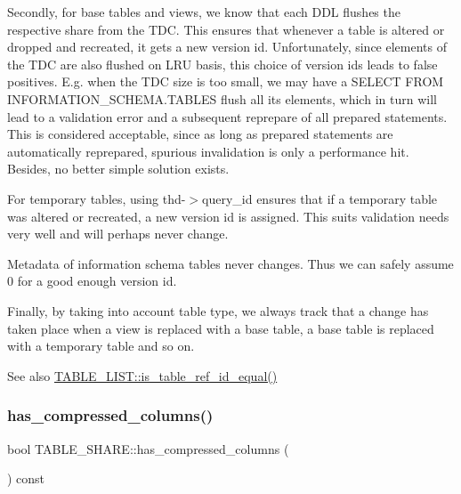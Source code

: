 Secondly, for base tables and views, we know that each D\+DL flushes the respective share from the T\+DC. This ensures that whenever a table is altered or dropped and recreated, it gets a new version id. Unfortunately, since elements of the T\+DC are also flushed on L\+RU basis, this choice of version ids leads to false positives. E.\+g. when the T\+DC size is too small, we may have a S\+E\+L\+E\+CT F\+R\+OM I\+N\+F\+O\+R\+M\+A\+T\+I\+O\+N\+\_\+\+S\+C\+H\+E\+M\+A.\+T\+A\+B\+L\+ES flush all its elements, which in turn will lead to a validation error and a subsequent reprepare of all prepared statements. This is considered acceptable, since as long as prepared statements are automatically reprepared, spurious invalidation is only a performance hit. Besides, no better simple solution exists.

For temporary tables, using thd-\/$>$query\+\_\+id ensures that if a temporary table was altered or recreated, a new version id is assigned. This suits validation needs very well and will perhaps never change.

Metadata of information schema tables never changes. Thus we can safely assume 0 for a good enough version id.

Finally, by taking into account table type, we always track that a change has taken place when a view is replaced with a base table, a base table is replaced with a temporary table and so on.

\begin{DoxySeeAlso}{See also}
\mbox{\hyperlink{structTABLE__LIST_a187525004d9f242ed0b6291d333ebea0}{T\+A\+B\+L\+E\+\_\+\+L\+I\+S\+T\+::is\+\_\+table\+\_\+ref\+\_\+id\+\_\+equal()}} 
\end{DoxySeeAlso}
\mbox{\label{structTABLE__SHARE_a8fb1d77c5db742bdbaf613c0d7923581}} 
\subsubsection{\texorpdfstring{has\+\_\+compressed\+\_\+columns()}{has\_compressed\_columns()}}
{\footnotesize\ttfamily bool T\+A\+B\+L\+E\+\_\+\+S\+H\+A\+R\+E\+::has\+\_\+compressed\+\_\+columns (\begin{DoxyParamCaption}{ }\end{DoxyParamCaption}) const}

